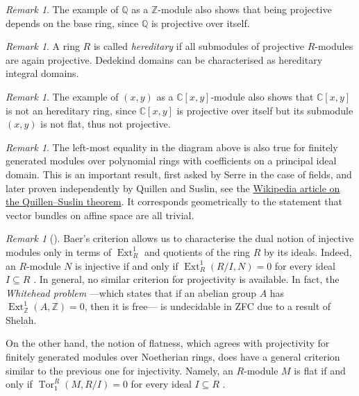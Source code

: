 \documentclass[A4paper, 12pt, british, reqno]{amsart}
\newcommand{\C}{\mathbb{C}} %
\newcommand{\Q}{\mathbb{Q}} %
\newcommand{\Z}{\mathbb{Z}} %
\theoremstyle{plain}
\theoremstyle{definition}
\theoremstyle{remark}
\newtheorem{rem}[thm]{Remark}
\theoremstyle{plain}
\theoremstyle{definition}
\theoremstyle{remark}
\theoremstyle{plain}
\theoremstyle{definition}
\theoremstyle{remark}
\DeclareMathOperator{\Ext}{Ext}
\DeclareMathOperator{\Tor}{Tor}
\begin{document}
\begin{rem}
    The example of $\Q$ as a $\Z$-module also shows that being projective depends on the base ring, since $\Q$ is projective over itself.
\end{rem}

\begin{rem}
    A ring $R$ is called \textit{hereditary} if all submodules of projective $R$-modules are again projective.
    Dedekind domains can be characterised as hereditary integral domains.
\end{rem}

\begin{rem}
    The example of $(x,y)$ as a $\C[x,y]$-module also shows that $\C[x,y]$ is not an hereditary ring, since $\C[x,y]$ is projective over itself but its submodule $(x,y)$ is not flat, thus not projective.
\end{rem}

\begin{rem}
    The left-most equality in the diagram above is also true for finitely generated modules over polynomial rings with coefficients on a principal ideal domain.
    This is an important result, first asked by Serre in the case of fields, and later proven independently by Quillen and Suslin, see the \href{https://en.wikipedia.org/wiki/Quillen-Suslin_theorem}{Wikipedia article on the Quillen--Suslin theorem}.
    It corresponds geometrically to the statement that vector bundles on affine space are all trivial.
\end{rem}

{\color{gray}
\begin{rem}[{\cite{fra18}}]
    Baer's criterion \cite[Prop.~1.1.1]{fra18} allows us to characterise the dual notion of injective modules only in terms of $\Ext^{1}_{R}$ and quotients of the ring $R$ by its ideals.
    Indeed, an $R$-module $N$ is injective if and only if $\Ext^{1}_{R}(R/I,N)=0$ for every ideal $I\subseteq R$ \cite[Prop.~1.1.4]{fra18}.
    In general, no similar criterion for projectivity is available.
    In fact, the \textit{Whitehead problem} ---which states that if an abelian group $A$ has $\Ext^{1}_{\Z}(A,\Z)=0$, then it is free--- is undecidable in ZFC due to a result of Shelah.

    On the other hand, the notion of flatness, which agrees with projectivity for finitely generated modules over Noetherian rings, does have a general criterion similar to the previous one for injectivity.
    Namely, an $R$-module $M$ is flat if and only if $\Tor_{1}^{R}(M,R/I)=0$ for every ideal $I\subseteq R$ \cite[Prop.~1.2.3]{fra18}.
\end{rem}
}
\end{document}
